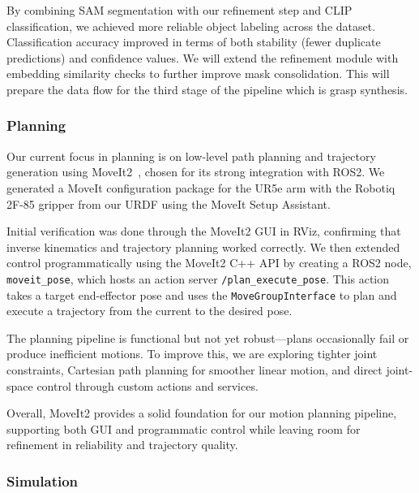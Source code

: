 \documentclass[12pt]{extarticle}
\begin{document}
By combining SAM segmentation with our refinement step and CLIP classification, we achieved more reliable object labeling across the dataset. Classification accuracy improved in terms of both stability (fewer duplicate predictions) and confidence values. We will extend the refinement module with embedding similarity checks to further improve mask consolidation. This will prepare the data flow for the third stage of the pipeline which is grasp synthesis.

\subsubsection{Planning}

Our current focus in planning is on low-level path planning and trajectory generation using MoveIt2~\cite{moveit2}, chosen for its strong integration with ROS2. We generated a MoveIt configuration package for the UR5e arm with the Robotiq 2F-85 gripper from our URDF using the MoveIt Setup Assistant.

Initial verification was done through the MoveIt2 GUI in RViz, confirming that inverse kinematics and trajectory planning worked correctly. We then extended control programmatically using the MoveIt2 C++ API by creating a ROS2 node, \texttt{moveit\_pose}, which hosts an action server \texttt{/plan\_execute\_pose}. This action takes a target end-effector pose and uses the \texttt{MoveGroupInterface} to plan and execute a trajectory from the current to the desired pose.

The planning pipeline is functional but not yet robust—plans occasionally fail or produce inefficient motions. To improve this, we are exploring tighter joint constraints, Cartesian path planning for smoother linear motion, and direct joint-space control through custom actions and services.

Overall, MoveIt2 provides a solid foundation for our motion planning pipeline, supporting both GUI and programmatic control while leaving room for refinement in reliability and trajectory quality.


\subsubsection{Simulation}
\end{document}
